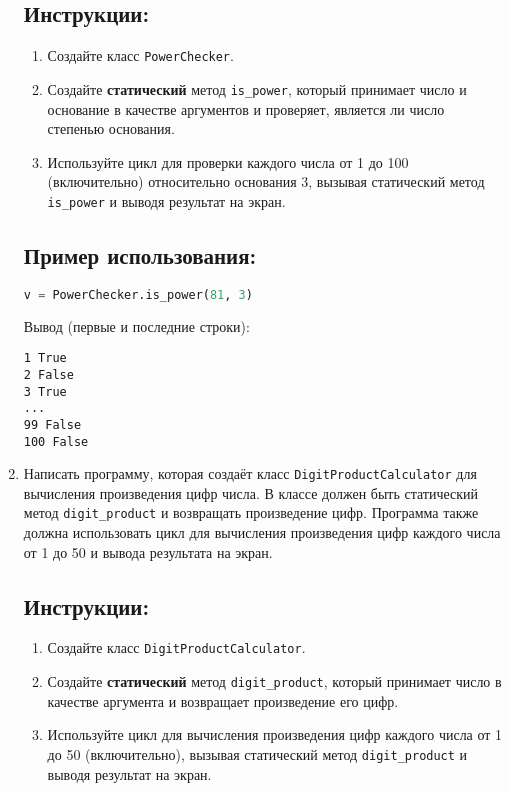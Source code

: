 \begin{enumerate}
\subsection*{Инструкции:}
\begin{enumerate}
    \item Создайте класс \texttt{PowerChecker}.
    \item Создайте \textbf{статический} метод \texttt{is\_power}, который принимает число и основание в качестве аргументов и проверяет, является ли число степенью основания.
    \item Используйте цикл для проверки каждого числа от 1 до 100 (включительно) относительно основания 3, вызывая статический метод \texttt{is\_power} и выводя результат на экран.
\end{enumerate}

\subsection*{Пример использования:}
\begin{lstlisting}[language=Python]
    v = PowerChecker.is_power(81, 3)
\end{lstlisting}
Вывод (первые и последние строки):
\begin{verbatim}
1 True
2 False
3 True
...
99 False
100 False
\end{verbatim}

\item
Написать программу, которая создаёт класс \texttt{DigitProductCalculator} 
для вычисления произведения цифр числа. В классе должен быть статический метод
\texttt{digit\_product} и возвращать произведение цифр. 
Программа также должна использовать цикл для вычисления произведения цифр каждого числа от 
1 до 50 и вывода результата на экран.

\subsection*{Инструкции:}
\begin{enumerate}
    \item Создайте класс \texttt{DigitProductCalculator}.
    \item Создайте \textbf{статический} метод \texttt{digit\_product}, который принимает число в качестве аргумента и возвращает произведение его цифр.
    \item Используйте цикл для вычисления произведения цифр каждого числа от 1 до 50 (включительно), вызывая статический метод \texttt{digit\_product} и выводя результат на экран.
\end{enumerate}


\end{enumerate}
